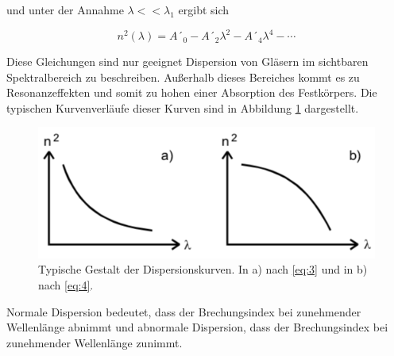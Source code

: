 und unter der Annahme $\lambda << \lambda_1$ ergibt sich

\begin{equation}
  n^2(\lambda) = A´_0 - A´_2 \lambda^2 - A´_4 \lambda^4 - \dotsb
  \label{eq:4}
\end{equation}

Diese Gleichungen sind nur geeignet Dispersion von Gläsern im sichtbaren
Spektralbereich zu beschreiben. Außerhalb dieses Bereiches kommt es zu Resonanzeffekten
und somit zu hohen einer Absorption des Festkörpers.
Die typischen Kurvenverläufe dieser Kurven sind in Abbildung \ref{abb:1} dargestellt.

\begin{figure}[H]
  \centering
  \includegraphics[width=\textwidth]{content/Dispersion.png}
  \caption{Typische Gestalt der Dispersionskurven. In a) nach \ref{eq:3} und in b) nach \ref{eq:4}. \cite{1}}
  \label{abb:1}
\end{figure}

Normale Dispersion bedeutet, dass der Brechungsindex bei zunehmender Wellenlänge abnimmt
und abnormale Dispersion, dass der Brechungsindex bei zunehmender Wellenlänge zunimmt.
